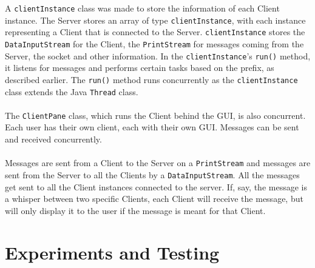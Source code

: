 \documentclass[12pt]{article}
\begin{document}
A \texttt{clientInstance} class was made to store the information of each Client instance. The Server stores
an array of type \texttt{clientInstance}, with each instance representing a Client that is connected
to the Server. \texttt{clientInstance} stores the \texttt{DataInputStream} for the Client, the \texttt{PrintStream} for messages coming
from the Server, the socket and other information. In the \texttt{clientInstance}'s \texttt{run()} method, it listens
for messages and performs certain tasks based on the prefix, as described earlier. The \texttt{run()}
method runs concurrently as the \texttt{clientInstance} class extends the Java \texttt{Thread} class.
\\\\
The \texttt{ClientPane} class, which runs the Client behind the GUI, is also concurrent.
Each user has their own client, each with their own GUI. Messages can be sent and received
concurrently.
\\\\
Messages are sent from a Client to the Server on a \texttt{PrintStream} and messages are sent from the Server
to all the Clients by a \texttt{DataInputStream}. All the messages get sent to all the Client
instances connected to the server. If, say, the message is a whisper between two
specific Clients, each Client will receive the message, but will only display it to the
user if the message is meant for that Client.

\section{Experiments and Testing}
\end{document}
